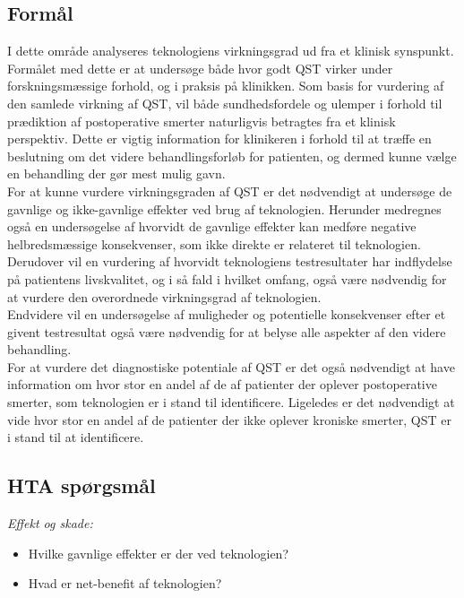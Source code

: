 \subsection{Formål}
I dette område analyseres teknologiens virkningsgrad ud fra et klinisk synspunkt. Formålet med dette er at undersøge både hvor godt QST virker under forskningsmæssige forhold, og i praksis på klinikken. Som basis for vurdering af den samlede virkning af QST, vil både sundhedsfordele og ulemper i forhold til prædiktion af postoperative smerter naturligvis betragtes fra et klinisk perspektiv. Dette er vigtig information for klinikeren i forhold til at træffe en beslutning om det videre behandlingsforløb for patienten, og dermed kunne vælge en behandling der gør mest mulig gavn.\\
For at kunne vurdere virkningsgraden af QST er det nødvendigt at undersøge de gavnlige og ikke-gavnlige effekter ved brug af teknologien. Herunder medregnes også en undersøgelse af hvorvidt de gavnlige effekter kan medføre negative helbredsmæssige konsekvenser, som ikke direkte er relateret til teknologien.\\
Derudover vil en vurdering af hvorvidt teknologiens testresultater har indflydelse på patientens livskvalitet, og i så fald i hvilket omfang, også være nødvendig for at vurdere den overordnede virkningsgrad af teknologien. \\
Endvidere vil en undersøgelse af muligheder og potentielle konsekvenser efter et givent testresultat også være nødvendig for at belyse alle aspekter af den videre behandling.\\
For at vurdere det diagnostiske potentiale af QST er det også nødvendigt at have information om hvor stor en andel af de af patienter der oplever postoperative smerter, som teknologien er i stand til identificere. Ligeledes er det nødvendigt at vide hvor stor en andel af de patienter der ikke oplever kroniske smerter, QST er i stand til at identificere.
\subsection{HTA spørgsmål} %

\textit{Effekt og skade:}
\begin{itemize}
	\item Hvilke gavnlige effekter er der ved teknologien? %
	\item Hvad er net-benefit af teknologien? %
\end{itemize}

